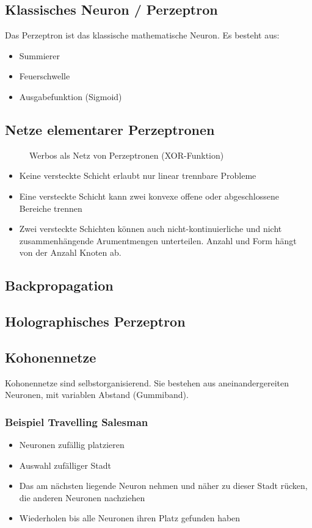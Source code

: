 \subsection{Klassisches Neuron / Perzeptron}
Das Perzeptron ist das klassische mathematische Neuron. Es besteht aus:
\begin{itemize}
	\item Summierer
	\item Feuerschwelle
	\item Ausgabefunktion (Sigmoid)
\end{itemize}

\subsection{Netze elementarer Perzeptronen}
\begin{figure}[h!]
	\centering
	
	\caption{Werbos als Netz von Perzeptronen (XOR-Funktion)}
\end{figure}
\begin{itemize}
	\item Keine versteckte Schicht erlaubt nur linear trennbare Probleme
	\item Eine versteckte Schicht kann zwei konvexe offene oder abgeschlossene Bereiche trennen
	\item Zwei versteckte Schichten können auch nicht-kontinuierliche und nicht zusammenhängende
		Arumentmengen unterteilen. Anzahl und Form hängt von der Anzahl Knoten ab.
\end{itemize}

\subsection{Backpropagation}

\subsection{Holographisches Perzeptron}

\subsection{Kohonennetze}
Kohonennetze sind selbstorganisierend. Sie bestehen aus aneinandergereiten Neuronen, mit variablen
Abstand (Gummiband).

\subsubsection{Beispiel Travelling Salesman}
\begin{itemize}
	\item Neuronen zufällig platzieren
	\item Auswahl zufälliger Stadt
	\item Das am nächsten liegende Neuron nehmen und näher zu dieser Stadt rücken, die anderen Neuronen nachziehen
	\item Wiederholen bis alle Neuronen ihren Platz gefunden haben
\end{itemize}


